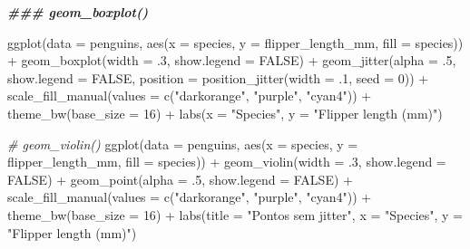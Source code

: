 \documentclass[
]{book}
\newenvironment{Shaded}{\begin{snugshade}}{\end{snugshade}}
\newcommand{\AttributeTok}[1]{\textcolor[rgb]{0.61,0.61,0.61}{#1}}
\newcommand{\CommentTok}[1]{\textcolor[rgb]{0.37,0.37,0.37}{\textit{#1}}}
\newcommand{\ConstantTok}[1]{\textcolor[rgb]{0,0,0}{#1}}
\newcommand{\DecValTok}[1]{\textcolor[rgb]{0.06,0.06,0.06}{#1}}
\newcommand{\DocumentationTok}[1]{\textcolor[rgb]{0.37,0.37,0.37}{\textbf{\textit{#1}}}}
\newcommand{\FunctionTok}[1]{\textcolor[rgb]{0,0,0}{#1}}
\newcommand{\NormalTok}[1]{#1}
\newcommand{\SpecialCharTok}[1]{\textcolor[rgb]{0,0,0}{#1}}
\newcommand{\StringTok}[1]{\textcolor[rgb]{0.5,0.5,0.5}{#1}}
\begin{document}
\begin{Shaded}
\begin{Highlighting}[]

\DocumentationTok{\#\#\# geom\_boxplot()}

\FunctionTok{ggplot}\NormalTok{(}\AttributeTok{data =}\NormalTok{ penguins, }
       \FunctionTok{aes}\NormalTok{(}\AttributeTok{x =}\NormalTok{ species, }\AttributeTok{y =}\NormalTok{ flipper\_length\_mm, }\AttributeTok{fill =}\NormalTok{ species)) }\SpecialCharTok{+}
  \FunctionTok{geom\_boxplot}\NormalTok{(}\AttributeTok{width =}\NormalTok{ .}\DecValTok{3}\NormalTok{, }
               \AttributeTok{show.legend =} \ConstantTok{FALSE}\NormalTok{) }\SpecialCharTok{+}
  \FunctionTok{geom\_jitter}\NormalTok{(}\AttributeTok{alpha =}\NormalTok{ .}\DecValTok{5}\NormalTok{, }
              \AttributeTok{show.legend =} \ConstantTok{FALSE}\NormalTok{, }
              \AttributeTok{position =} \FunctionTok{position\_jitter}\NormalTok{(}\AttributeTok{width =}\NormalTok{ .}\DecValTok{1}\NormalTok{, }\AttributeTok{seed =} \DecValTok{0}\NormalTok{)) }\SpecialCharTok{+}
  \FunctionTok{scale\_fill\_manual}\NormalTok{(}\AttributeTok{values =} \FunctionTok{c}\NormalTok{(}\StringTok{"darkorange"}\NormalTok{, }\StringTok{"purple"}\NormalTok{, }\StringTok{"cyan4"}\NormalTok{)) }\SpecialCharTok{+}
  \FunctionTok{theme\_bw}\NormalTok{(}\AttributeTok{base\_size =} \DecValTok{16}\NormalTok{) }\SpecialCharTok{+}
  \FunctionTok{labs}\NormalTok{(}\AttributeTok{x =} \StringTok{"Species"}\NormalTok{, }\AttributeTok{y =} \StringTok{"Flipper length (mm)"}\NormalTok{)}


\CommentTok{\# geom\_violin()}
\FunctionTok{ggplot}\NormalTok{(}\AttributeTok{data =}\NormalTok{ penguins, }
       \FunctionTok{aes}\NormalTok{(}\AttributeTok{x =}\NormalTok{ species, }\AttributeTok{y =}\NormalTok{ flipper\_length\_mm, }\AttributeTok{fill =}\NormalTok{ species)) }\SpecialCharTok{+}
  \FunctionTok{geom\_violin}\NormalTok{(}\AttributeTok{width =}\NormalTok{ .}\DecValTok{3}\NormalTok{, }
              \AttributeTok{show.legend =} \ConstantTok{FALSE}\NormalTok{) }\SpecialCharTok{+}
  \FunctionTok{geom\_point}\NormalTok{(}\AttributeTok{alpha =}\NormalTok{ .}\DecValTok{5}\NormalTok{, }
              \AttributeTok{show.legend =} \ConstantTok{FALSE}\NormalTok{) }\SpecialCharTok{+}
  \FunctionTok{scale\_fill\_manual}\NormalTok{(}\AttributeTok{values =} \FunctionTok{c}\NormalTok{(}\StringTok{"darkorange"}\NormalTok{, }\StringTok{"purple"}\NormalTok{, }\StringTok{"cyan4"}\NormalTok{)) }\SpecialCharTok{+}
  \FunctionTok{theme\_bw}\NormalTok{(}\AttributeTok{base\_size =} \DecValTok{16}\NormalTok{) }\SpecialCharTok{+}
  \FunctionTok{labs}\NormalTok{(}\AttributeTok{title =} \StringTok{"Pontos sem jitter"}\NormalTok{, }\AttributeTok{x =} \StringTok{"Species"}\NormalTok{, }\AttributeTok{y =} \StringTok{"Flipper length (mm)"}\NormalTok{)}


\end{Highlighting}
\end{Shaded}
\end{document}
